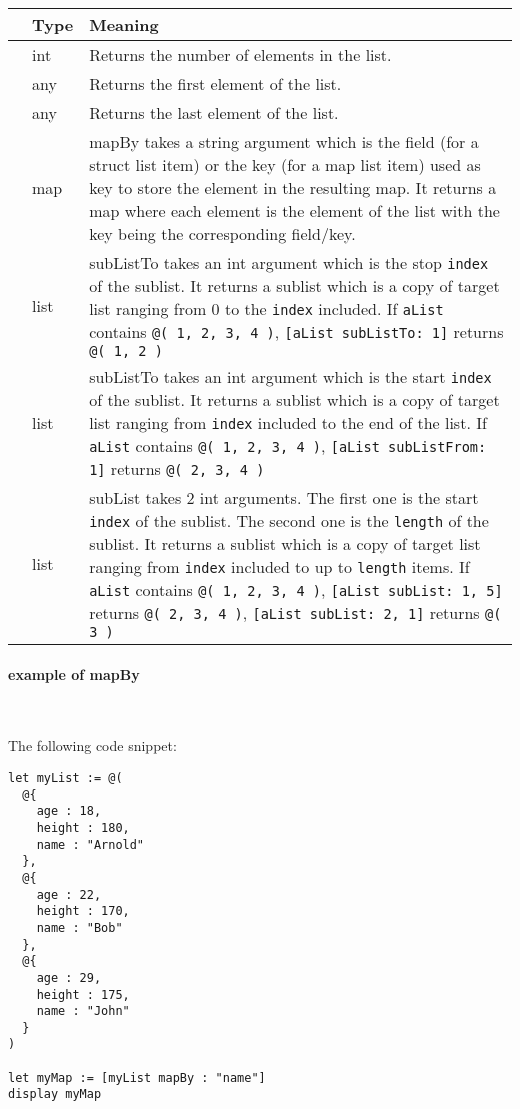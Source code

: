 \documentclass[11pt]{article}
\newcommand{\cfunction}[1]{{\ttfamily #1}}
\begin{document}
\begin{longtable}{>{\ttfamily}l|l|p{3.88in}}
{\bf getter}&{\bf Type}&{\bf Meaning}\\
\hline\endhead
 {length}&
  {int}&
  {Returns the number of elements in the list.}\\
 {first}&
  {any}&
  {Returns the first element of the list.}\\
 {last}&
  {any}&
  {Returns the last element of the list.}\\
 {mapBy}&
  {map}&
  {\cfunction{mapBy} takes a string argument which is the field (for a struct list item) or the key (for a map list item) used as key to store the element in the resulting map. It returns a map where each element is the element of the list with the key being the corresponding field/key.}\\
 {subListTo}&
  {list}&
  {\cfunction{subListTo} takes an int argument which is the stop \texttt{index} of the sublist. It returns a sublist which is a copy of target list ranging from 0 to the \texttt{index} included. If \texttt{aList} contains \texttt{@( 1, 2, 3, 4 )}, \texttt{[aList subListTo: 1]} returns \texttt{@( 1, 2 )}}\\
 {subListFrom}&
  {list}&
  {\cfunction{subListTo} takes an int argument which is the start \texttt{index} of the sublist. It returns a sublist which is a copy of target list ranging from \texttt{index} included to the end of the list. If \texttt{aList} contains \texttt{@( 1, 2, 3, 4 )}, \texttt{[aList subListFrom: 1]} returns \texttt{@( 2, 3, 4 )}}\\
 {subList}&
  {list}&
  {\cfunction{subList} takes 2 int arguments. The first one is the start \texttt{index} of the sublist. The second one is the \texttt{length} of the sublist. It returns a sublist which is a copy of target list ranging from \texttt{index} included to up to \texttt{length} items. If \texttt{aList} contains \texttt{@( 1, 2, 3, 4 )}, \texttt{[aList subList: 1, 5]} returns \texttt{@( 2, 3, 4 )},  \texttt{[aList subList: 2, 1]} returns \texttt{@( 3 )}}\\
\end{longtable}

\paragraph{example of \cfunction{mapBy}}~

The following code snippet:

\begin{lstlisting}[language=goilTemplate]
let myList := @(
  @{
    age : 18,
    height : 180,
    name : "Arnold"
  },
  @{
    age : 22,
    height : 170,
    name : "Bob"
  },
  @{
    age : 29,
    height : 175,
    name : "John"
  }
)

let myMap := [myList mapBy : "name"]
display myMap
\end{lstlisting}
\end{document}
